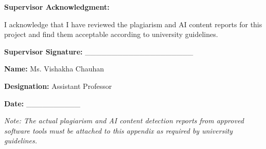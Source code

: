 \textbf{Supervisor Acknowledgment:}

I acknowledge that I have reviewed the plagiarism and AI content reports for this project and find them acceptable according to university guidelines.

\vspace{1cm}

\textbf{Supervisor Signature:} \_\_\_\_\_\_\_\_\_\_\_\_\_\_\_\_\_\_\_\_

\textbf{Name:} Ms. Vishakha Chauhan

\textbf{Designation:} Assistant Professor

\textbf{Date:} \_\_\_\_\_\_\_\_\_\_

\vspace{1cm}

\textit{Note: The actual plagiarism and AI content detection reports from approved software tools must be attached to this appendix as required by university guidelines.}

